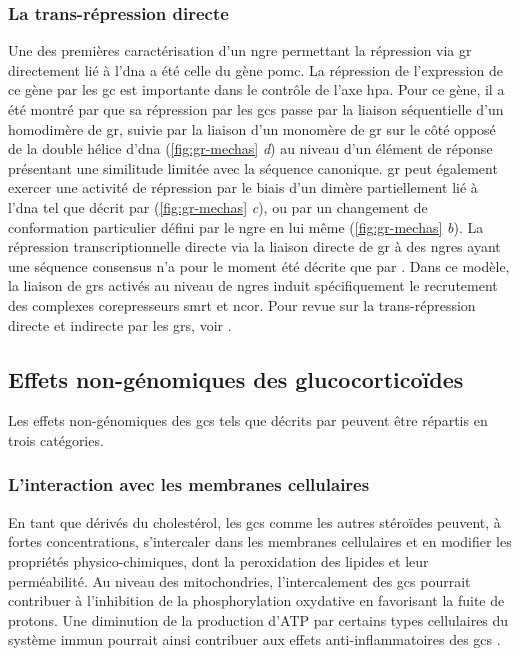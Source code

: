 \documentclass[../main.tex]{subfiles}
\begin{document}
\subsubsection{La trans-répression directe}
Une des premières caractérisation d'un \gls{ngre} permettant la répression via \gls{gr} directement lié à l'\gls{dna} a été celle du gène \gls{pomc}.
La répression de l'expression de ce gène par les \gls{gc} est importante dans le contrôle de l'axe \gls{hpa}.
Pour ce gène, il a été montré par \citet{Drouin1993} que sa répression par les \glspl{gc} passe par la liaison séquentielle d'un homodimère de \gls{gr}, suivie par la liaison d'un monomère de \gls{gr} sur le côté opposé de la double hélice d'\gls{dna} (\autoref{fig:gr-mechas} \textit{d}) au niveau d'un élément de réponse présentant une similitude limitée avec la séquence canonique.
\gls{gr} peut également exercer une activité de répression par le biais d'un dimère partiellement lié à l'\gls{dna} tel que décrit par \citet{Lefstin1998} (\autoref{fig:gr-mechas} \textit{c}), ou par un changement de conformation particulier défini par le \gls{ngre} en lui même (\autoref{fig:gr-mechas} \textit{b}).
La répression transcriptionnelle directe via la liaison directe de \gls{gr} à des \glspl{ngre} ayant une séquence consensus n'a pour le moment été décrite que par \citet{Surjit2011}.
Dans ce modèle, la liaison de \glspl{gr} activés au niveau de \glspl{ngre} induit spécifiquement le recrutement des complexes corepresseurs \gls{smrt} et \gls{ncor}.
Pour revue sur la trans-répression directe et indirecte par les \glspl{gr}, voir \citet{Dostert2004}.

\subsection{Effets non-génomiques des glucocorticoïdes}
Les effets non-génomiques des \glspl{gc} tels que décrits par \citet{Stahn2008a} peuvent être répartis en trois catégories.

\subsubsection{L'interaction avec les membranes cellulaires}
En tant que dérivés du cholestérol, les \glspl{gc} comme les autres stéroïdes peuvent, à fortes concentrations, s'intercaler dans les membranes cellulaires et en modifier les propriétés physico-chimiques, dont la peroxidation des lipides et leur perméabilité.
Au niveau des mitochondries, l'intercalement des \glspl{gc} pourrait contribuer à l'inhibition de la phosphorylation oxydative en favorisant la fuite de protons.
Une diminution de la production d'ATP par certains types cellulaires du système immun pourrait ainsi contribuer aux effets anti-inflammatoires des \glspl{gc} \citep{Buttgereit2002}.
\end{document}

